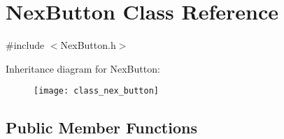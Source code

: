 \hypertarget{class_nex_button}{\section{Nex\+Button Class Reference}
\label{class_nex_button}
}


{\ttfamily \#include $<$Nex\+Button.\+h$>$}

Inheritance diagram for Nex\+Button\+:\begin{figure}[H]
\begin{center}
\leavevmode
\texttt{[image: class\_nex\_button]}
\end{center}
\end{figure}
\subsection*{Public Member Functions}
